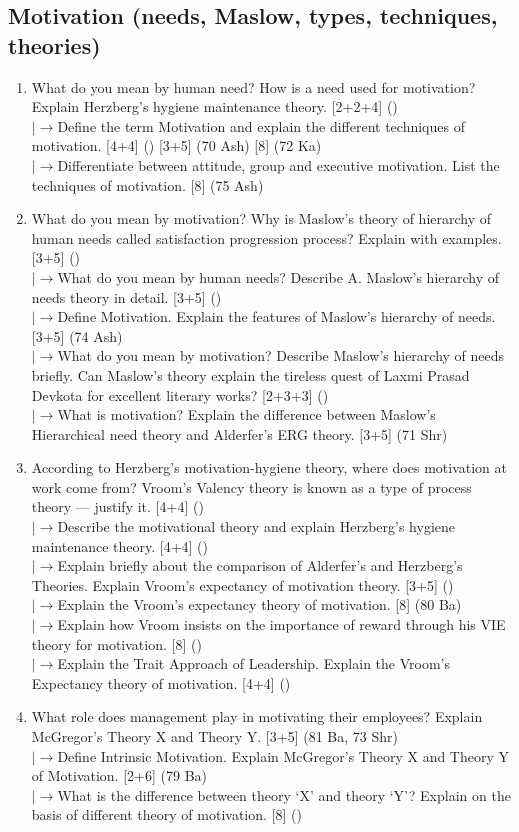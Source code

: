 \documentclass[12pt]{article}
\newcommand{\lb}{\\$\left|\rightarrow\right.$}
\begin{document}
  \subsection{Motivation (needs, Maslow, types, techniques, theories)}
    \begin{enumerate}[topsep=0pt, noitemsep]
      \item What do you mean by human need? How is a need used for motivation? Explain Herzberg's hygiene maintenance theory. \hfill [2+2+4] ()
        \lb Define the term Motivation and explain the different techniques of motivation. \hfill [4+4] () [3+5] (70 Ash) [8] (72 Ka)
        \lb Differentiate between attitude, group and executive motivation. List the techniques of motivation. \hfill [8] (75 Ash)

      \item What do you mean by motivation? Why is Maslow's theory of hierarchy of human needs called satisfaction progression process? Explain with examples. \hfill [3+5] ()
        \lb What do you mean by human needs? Describe A. Maslow's hierarchy of needs theory in detail. \hfill [3+5] ()
        \lb Define Motivation. Explain the features of Maslow's hierarchy of needs. \hfill [3+5] (74 Ash)
        \lb What do you mean by motivation? Describe Maslow's hierarchy of needs briefly. Can Maslow's theory explain the tireless quest of Laxmi Prasad Devkota for excellent literary works? \hfill [2+3+3] ()
        \lb What is motivation? Explain the difference between Maslow's Hierarchical need theory and Alderfer's ERG theory. \hfill [3+5] (71 Shr)

      \item According to Herzberg's motivation-hygiene theory, where does motivation at work come from? Vroom's Valency theory is known as a type of process theory --- justify it. \hfill [4+4] ()
        \lb Describe the motivational theory and explain Herzberg's hygiene maintenance theory. \hfill [4+4] ()
        \lb Explain briefly about the comparison of Alderfer's and Herzberg's Theories. Explain Vroom's expectancy of motivation theory. \hfill [3+5] ()
        \lb Explain the Vroom's expectancy theory of motivation. \hfill [8] (80 Ba)
        \lb Explain how Vroom insists on the importance of reward through his VIE theory for motivation. \hfill [8] ()
        \lb Explain the Trait Approach of Leadership. Explain the Vroom's Expectancy theory of motivation. \hfill [4+4] ()

      \item What role does management play in motivating their employees? Explain McGregor's Theory X and Theory Y. \hfill [3+5] (81 Ba, 73 Shr)
        \lb Define Intrinsic Motivation. Explain McGregor's Theory X and Theory Y of Motivation. \hfill [2+6] (79 Ba)
        \lb What is the difference between theory `X' and theory `Y'? Explain on the basis of different theory of motivation. \hfill [8] ()
    \end{enumerate}
\end{document}
